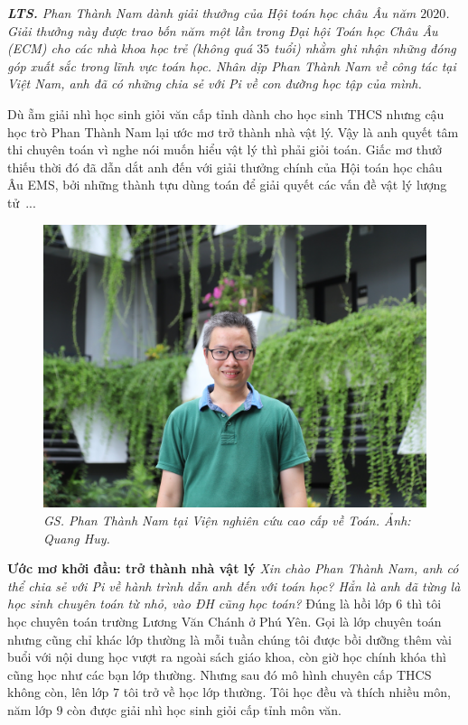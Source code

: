 \textit{\textbf{\color{diendantoanhoc}LTS.} Phan Thành Nam dành giải thưởng của Hội toán học châu Âu năm $2020$. Giải thưởng này được trao bốn năm một lần trong Đại hội Toán học Châu Âu (ECM) cho các nhà khoa học trẻ (không quá $35$ tuổi) nhằm ghi nhận những đóng góp xuất sắc trong lĩnh vực toán học. Nhân dịp Phan Thành Nam về công tác tại Việt Nam, anh đã có những chia sẻ với Pi về con đường học tập của mình.}
\begin{multicols}{2}
	Dù ẵm giải nhì học sinh giỏi văn cấp tỉnh dành cho học sinh THCS nhưng cậu học trò Phan Thành Nam lại ước mơ trở thành nhà vật lý. Vậy là anh quyết tâm thi chuyên toán vì nghe nói muốn hiểu vật lý thì phải giỏi toán. Giấc mơ thưở thiếu thời đó đã dẫn dắt anh đến với giải thưởng chính của Hội toán học châu Âu EMS, bởi những thành tựu dùng toán để giải quyết các vấn đề vật lý lượng tử~...
	\begin{figure}[H]
		\centering
		\vspace*{-5pt}
		\captionsetup{labelformat= empty, justification=centering}
		\includegraphics[width=1\linewidth]{1}
		\caption{\small\textit{\color{diendantoanhoc}GS. Phan Thành Nam tại Viện nghiên cứu cao cấp về Toán. Ảnh: Quang Huy.}}
		\vspace*{-5pt}
	\end{figure}
	\textbf{\color{diendantoanhoc}Ước mơ khởi đầu: trở thành nhà vật lý}
	\vskip 0.1cm
	\textit{Xin chào Phan Thành Nam, anh có thể chia sẻ với Pi về hành trình dẫn anh đến với toán học? Hẳn là anh đã từng là học sinh chuyên toán từ nhỏ, vào ĐH cũng học toán?}
	\vskip 0.1cm
	Đúng là hồi lớp $6$ thì tôi học chuyên toán trường Lương Văn Chánh ở Phú Yên. Gọi là lớp chuyên toán nhưng cũng chỉ khác lớp thường là mỗi tuần chúng tôi được bồi dưỡng thêm vài buổi với nội dung học vượt ra ngoài sách giáo khoa, còn giờ học chính khóa thì cũng học như các bạn lớp thường. Nhưng sau đó mô hình chuyên cấp THCS không còn, lên lớp $7$ tôi trở về học lớp thường. Tôi học đều và thích nhiều môn, năm lớp $9$ còn được giải nhì học sinh giỏi cấp tỉnh môn văn.

\end{multicols}
